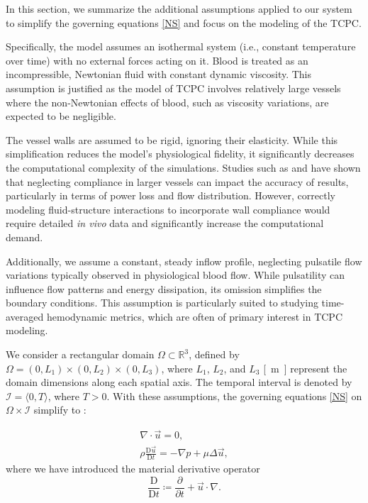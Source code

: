 
In this section, we summarize the additional assumptions applied to our system to simplify the governing equations \eqref{NS} and focus on the modeling of the TCPC.

Specifically, the model assumes an isothermal system (i.e., constant temperature over time) with no external forces acting on it. Blood is treated as an incompressible, Newtonian fluid with constant dynamic viscosity. This assumption is justified as the model of TCPC involves relatively large vessels where the non-Newtonian effects of blood, such as viscosity variations, are expected to be negligible.

The vessel walls are assumed to be rigid, ignoring their elasticity. While this simplification reduces the model's physiological fidelity, it significantly decreases the computational complexity of the simulations. 
Studies such as \cite{Masters2004} and \cite{Orlando2006} have shown that neglecting compliance in larger vessels can impact the accuracy of results, particularly in terms of power loss and flow distribution. However, correctly modeling fluid-structure interactions to incorporate wall compliance would require detailed \textit{in vivo} data and significantly increase the computational demand.

Additionally, we assume a constant, steady inflow profile, neglecting pulsatile flow variations typically observed in physiological blood flow. While pulsatility can influence flow patterns and energy dissipation, its omission simplifies the boundary conditions. This assumption is particularly suited to studying time-averaged hemodynamic metrics, which are often of primary interest in TCPC modeling.

We consider a rectangular domain $ \Omega \subset \mathbb{R}^3 $, defined by $ \Omega = (0, L_1) \times (0, L_2) \times (0, L_3) $, where $ L_1 $, $ L_2 $, and $ L_3 $ \si{[m]} represent the domain dimensions along each spatial axis. The temporal interval is denoted by $ \mathcal{I} = \langle 0, T \rangle $, where $ T > 0 $.
\newpage
With these assumptions, the governing equations \eqref{NS} on $ \Omega \times \mathcal{I} $ simplify to \cite{Schlichting}:

\begin{subequations}\label{NS s predpoklady}
	\begin{gather}
		\label{a s predpoklady}
		\nabla \cdot \vec{u} = 0, \\[5pt]
		\label{b s predpoklady}
		\rho \frac{\text{D} \vec{u}}{\text{D} t} = - \nabla p + \mu \Delta \vec{u},
	\end{gather}
\end{subequations}
where we have introduced the material derivative operator
\begin{equation}
	\dfrac{\text{D}}{\text{D} t} \coloneqq \dfrac{\partial}{\partial t} + \vec{u} \cdot \nabla.
\end{equation}

